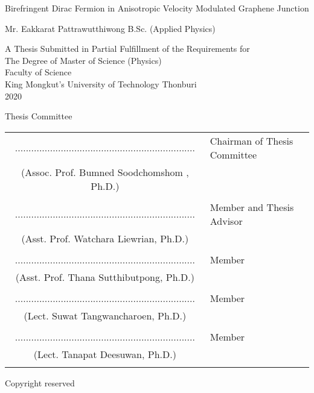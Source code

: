 \begin{center}
    Birefringent Dirac Fermion in Anisotropic Velocity Modulated Graphene Junction
    \\

    \vspace{1.5cm}

    Mr. Eakkarat    Pattrawutthiwong  B.Sc. (Applied Physics) \\

    \vspace{1.5cm}

    A Thesis Submitted in Partial Fulfillment of the Requirements for\\
    The Degree of Master of Science  (Physics) \\
    Faculty of Science \\
    King Mongkut's University of Technology Thonburi \\
    2020 \\
\end{center}

    \vspace{.3cm}\noindent Thesis Committee \vspace{1cm}

\noindent \begin{tabular}{cl}

    ...................................................................&   \hspace{0.3in} Chairman of Thesis Committee \\
    (Assoc. Prof. Bumned Soodchomshom , Ph.D.)  & \\ \\

    ...................................................................&   \hspace{0.3in} Member and Thesis Advisor\\
    (Asst. Prof. Watchara Liewrian, Ph.D.)  & \\ \\

    ...................................................................&   \hspace{0.3in} Member \\
    (Asst. Prof. Thana Sutthibutpong, Ph.D.)  & \\ \\

    ...................................................................&   \hspace{0.3in} Member\\
    (Lect. Suwat Tangwancharoen, Ph.D.)  & \\ \\

    ...................................................................&   \hspace{0.3in} Member \\
    (Lect. Tanapat Deesuwan, Ph.D.)  & \\ \\

\end{tabular}

\begin{center}
    Copyright reserved
\end{center}

